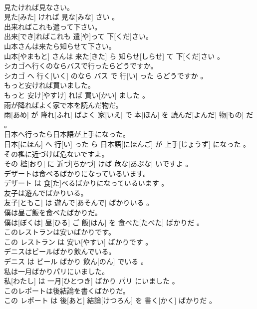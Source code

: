 \documentclass[8pt]{extreport}
\begin{document}
\begin{CJK}{UTF8}{min}
\\	見たければ見なさい。	
\\	見た[みた] ければ 見な[みな] さい 。
\\	出来ればこれも遣って下さい。	
\\	出来[でき]ればこれも 遣[や]って 下[くだ]さい。
\\	山本さんは来たら知らせて下さい。	
\\	山本[やまもと] さんは 来た[きた] ら 知らせ[しらせ] て 下[くだ]さい 。
\\	シカゴへ行くのならバスで行ったらどうですか。	
\\	シカゴ へ 行く[いく] のなら バス で 行[い] った らどうですか 。
\\	もっと安ければ買いました。	
\\	もっと 安け[やすけ] れば 買い[かい] ました 。
\\	雨が降ればよく家で本を読んだ物だ。	
\\	雨[あめ] が 降れ[ふれ] ばよく 家[いえ] で 本[ほん] を 読んだ[よんだ] 物[もの] だ 。
\\	日本へ行ったら日本語が上手になった。	
\\	日本[にほん] へ 行[い] った ら 日本語[にほんご] が 上手[じょうず] になった 。
\\	その檻に近づけば危ないですよ。	
\\	その 檻[おり] に 近づ[ちかづ] けば 危な[あぶな] いですよ 。
\\	デザートは食べるばかりになっているいます。	
\\	デザート は 食[た]べるばかりになっているいます 。
\\	友子は遊んでばかりいる。	
\\	友子[ともこ] は 遊んで[あそんで] ばかりいる 。
\\	僕は昼ご飯を食べたばかりだ。	
\\	僕は[ぼくは] 昼[ひる] ご 飯[はん] を 食べた[たべた] ばかりだ 。
\\	このレストランは安いばかりです。	
\\	この レストラン は 安い[やすい] ばかりです 。
\\	デニスはビールばかり飲んでいる。	
\\	デニス は ビール ばかり 飲ん[のん] でいる 。
\\	私は一月ばかりパリにいました。	
\\	私[わたし] は 一月[ひとつき] ばかり パリ にいました 。
\\	このレポートは後結論を書くばかりだ。	
\\	この レポート は 後[あと] 結論[けつろん] を 書く[かく] ばかりだ 。

\end{CJK}
\end{document}
